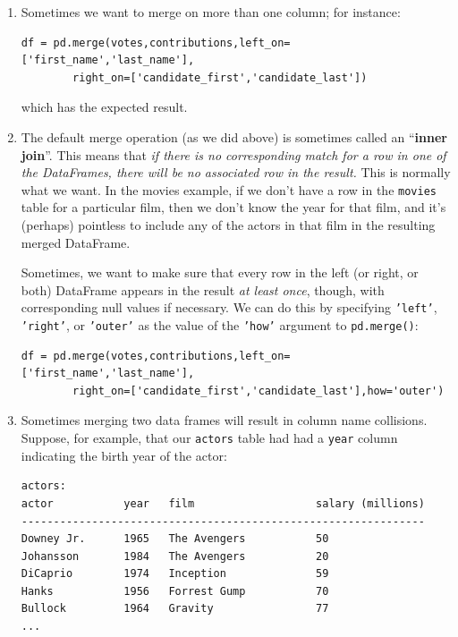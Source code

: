 \documentclass[12pt]{article}
\begin{document}
\begin{enumerate}
\itemsep.1em
\item Sometimes we want to merge on more than one column; for instance:

\begin{Verbatim}[fontsize=\small,samepage=true,frame=none]
df = pd.merge(votes,contributions,left_on=['first_name','last_name'],
        right_on=['candidate_first','candidate_last'])
\end{Verbatim}
which has the expected result.

\vspace{.2in}
\item The default merge operation (as we did above) is sometimes called an
``\textbf{inner join}''. This means that \textit{if there is no corresponding
match for a row in one of the DataFrames, there will be no associated row in
the result.} This is normally what we want. In the movies example, if we don't
have a row in the \texttt{movies} table for a particular film, then we don't
know the year for that film, and it's (perhaps) pointless to include any of
the actors in that film in the resulting merged DataFrame.

Sometimes, we want to make sure that every row in the left (or right, or
both) DataFrame appears in the result \textit{at least once}, though, with
corresponding null values if necessary. We can do this by specifying
\texttt{'left'}, \texttt{'right'}, or \texttt{'outer'} as the value of the
\texttt{'how'} argument to \texttt{pd.merge()}:

\begin{Verbatim}[fontsize=\small,samepage=true,frame=none]
df = pd.merge(votes,contributions,left_on=['first_name','last_name'],
        right_on=['candidate_first','candidate_last'],how='outer')
\end{Verbatim}

\vspace{.2in}
\item Sometimes merging two data frames will result in column name
collisions. Suppose, for example, that our \texttt{actors} table had had a
\texttt{year} column indicating the birth year of the actor:

\begin{Verbatim}[fontsize=\small,samepage=true,frame=none]
                        actors:
actor           year   film                   salary (millions)
---------------------------------------------------------------
Downey Jr.      1965   The Avengers           50
Johansson       1984   The Avengers           20
DiCaprio        1974   Inception              59
Hanks           1956   Forrest Gump           70
Bullock         1964   Gravity                77
...
\end{Verbatim}


\end{enumerate}
\end{document}

